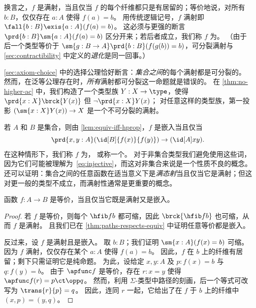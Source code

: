 换言之，$f$ 是满射，当且仅当 $f$ 的每个纤维都只是有居留的；等价地说，对所有 $b:B$，仅仅存在 $a:A$ 使得 $f(a)=b$。
用传统逻辑记号，$f$ 满射即 $\fall{b:B}\exis{a:A} (f(a)=b)$。
这必须与更强的断言 $\prd{b:B}\sm{a:A} (f(a)=b)$ 区分开来；若后者成立，我们称 $f$ 为。
%
%
%
%
（由于后一个类型等价于 $\sm{g:B\to A}\prd{b:B} (f(g(b))=b)$，可分裂满射与 \cref{sec:contractibility} 中定义的\emph{退化}是同一回事。）
%
%

\cref{sec:axiom-choice} 中的选择公理恰好断言：\emph{集合之间}的每个满射都是可分裂的。
然而，在泛等公理存在时，\emph{所有}满射都可分裂这一命题就是错误的。
在 \cref{thm:no-higher-ac} 中，我们构造了一个类型族 $Y:X\to \type$，使得 $\prd{x:X} \brck{Y(x)}$ 但 $\neg \prd{x:X} Y(x)$；
对任意这样的类型族，第一投影 $(\sm{x:X} Y(x)) \to X$ 是一个不可分裂的满射。

若 $A$ 和 $B$ 是集合，则由 \cref{lem:equiv-iff-hprop}，$f$ 是嵌入当且仅当
\begin{equation}
  \prd{x,y:A} (\id[B]{f(x)}{f(y)}) \to (\id[A]xy).\label{eq:injective}
\end{equation}
在这种情形下，我们称 $f$ 为，
%
%
或称一个。
%
对于非集合类型我们避免使用这些词，因为它们可能被理解为~\eqref{eq:injective}，而这对非集合来说是一个性质不良的概念。
还可以证明：集合之间的任意函数在适当意义下是\emph{满态射}当且仅当它是满射；但这对更一般的类型不成立，而满射性通常是更重要的概念。

\begin{thm}\label{thm:mono-surj-equiv}
  函数 $f:A\to B$ 是等价，当且仅当它既是满射又是嵌入。
\end{thm}
\begin{proof}
  若 $f$ 是等价，则每个 $\hfib f b$ 都可缩，因此 $\brck{\hfib f b}$ 也可缩，从而 $f$ 是满射。
  且我们已在 \cref{thm:paths-respects-equiv} 中证明任意等价都是嵌入。

  反过来，设 $f$ 是满射且是嵌入。
  取 $b:B$；我们证明 $\sm{x:A}(f(x)=b)$ 可缩。
  因为 $f$ 满射，仅仅存在某个 $a:A$ 使得 $f(a)=b$。
  因此，$f$ 在 $b$ 上的纤维有居留；剩下只需证明它是纯命题。
  为此，设给定 $x,y:A$ 及 $p:f(x)=b$ 与 $q:f(y)=b$。
  由于 $\apfunc f$ 是等价，存在 $r:x=y$ 使得 $\apfunc f (r) = p \ct \opp q$。
  然而，利用 $\Sigma$-类型中路径的刻画，后一个等式可改写为 $\trans{r}{p} = q$。
  因此，连同 $r$ 一起，它给出了在 $f$ 于 $b$ 上的纤维中 $(x,p) = (y,q)$。
\end{proof}

